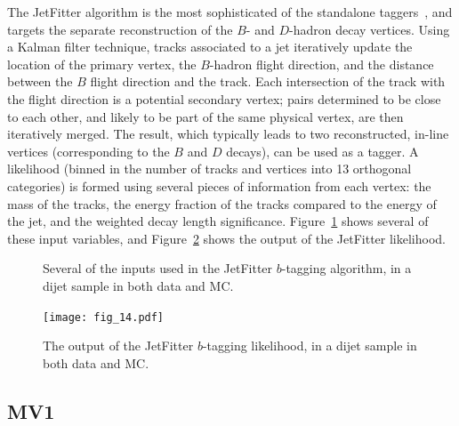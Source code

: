 The JetFitter algorithm is the most sophisticated of the standalone taggers~\cite{ATLAS-B,JetFitter}, and targets the separate reconstruction of the $B$- and $D$-hadron decay vertices. Using a Kalman filter technique, tracks associated to a jet iteratively update the location of the primary vertex, the $B$-hadron flight direction, and the distance between the $B$ flight direction and the track. Each intersection of the track with the flight direction is a potential secondary vertex; pairs determined to be close to each other, and likely to be part of the same physical vertex, are then iteratively merged. The result, which typically leads to two reconstructed, in-line vertices (corresponding to the $B$ and $D$ decays), can be used as a tagger. A likelihood (binned in the number of tracks and vertices into 13 orthogonal categories) is formed using several pieces of information from each vertex: the mass of the tracks, the energy fraction of the tracks compared to the energy of the jet, and the weighted decay length significance. Figure~\ref{fig:jet-reconstruction:b-tagging:jetfitter} shows several of these input variables, and Figure~\ref{fig:jet-reconstruction:b-tagging:jetfitter_total} shows the output of the JetFitter likelihood.


\begin{figure}
\centering
{}
\caption{Several of the inputs used in the JetFitter $b$-tagging algorithm, in a dijet sample in both data and MC.}
\label{fig:jet-reconstruction:b-tagging:jetfitter}
\end{figure}




\begin{figure}
\centering
\texttt{[image: fig\_14.pdf]}
\caption{The output of the JetFitter $b$-tagging likelihood, in a dijet sample in both data and MC.}
\label{fig:jet-reconstruction:b-tagging:jetfitter_total}
\end{figure}


\subsection{MV1}

